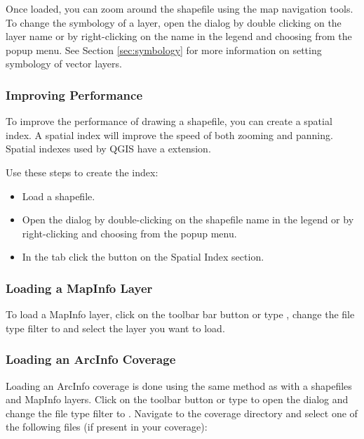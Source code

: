Once loaded, you can zoom around the shapefile using the map navigation tools.
To change the symbology of a layer, open the  dialog by double
clicking on the layer name or by right-clicking on the name in the legend and
choosing  from the popup menu. See
Section \ref{sec:symbology} for more information on setting symbology of
vector layers.
  
\subsubsection{Improving Performance}

To improve the performance of drawing a shapefile, you can create a spatial
index. A  spatial index will improve the 
speed of both zooming and panning. Spatial indexes used by QGIS have a 
 extension.

Use these steps to create the index:

\begin{itemize}
\item Load a shapefile.
\item Open the  dialog by double-clicking on the
shapefile name in the legend or by right-clicking and choosing
 from the popup menu.
\item In the tab  click the  button on the Spatial
Index section.
\end{itemize}

\subsubsection{Loading a MapInfo Layer}

To load a MapInfo layer, click on the 
toolbar bar button or type , change the file type filter to
 and select the layer you want to load.

\subsubsection{Loading an ArcInfo Coverage}

Loading an ArcInfo coverage is done using the same method as with a
shapefiles and MapInfo layers. Click on the 
toolbar button or type  to open the 
dialog and change the file type filter to
. Navigate to the coverage directory and select one
of the following files (if present in your coverage):

